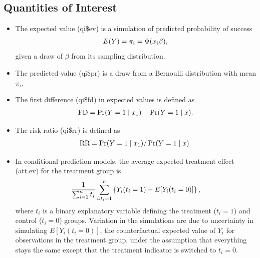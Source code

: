 \documentclass[letterpaper,10pt,english]{sphinxmanual}
\begin{document}
\subsection{Quantities of Interest}
\label{vignette:id49}\begin{itemize}
\item {} 
The expected value (qi\$ev) is a simulation of predicted probability
of success
\begin{gather}
\begin{split}E(Y) = \pi_i = \Phi(x_i
  \beta),\end{split}\notag
\end{gather}
given a draw of \(\beta\) from its sampling distribution.

\item {} 
The predicted value (qi\$pr) is a draw from a Bernoulli distribution
with mean \(\pi_i\).

\item {} 
The first difference (qi\$fd) in expected values is defined as
\begin{gather}
\begin{split}\textrm{FD} = \Pr(Y = 1 \mid x_1) - \Pr(Y = 1 \mid x).\end{split}\notag
\end{gather}
\item {} 
The risk ratio (qi\$rr) is defined as
\begin{gather}
\begin{split}\textrm{RR} = \Pr(Y = 1 \mid x_1) / \Pr(Y = 1 \mid x).\end{split}\notag
\end{gather}
\item {} 
In conditional prediction models, the average expected treatment
effect (att.ev) for the treatment group is
\begin{gather}
\begin{split}\frac{1}{\sum_{i=1}^n t_i}\sum_{i:t_i=1}^n \left\{ Y_i(t_i=1) -
      E[Y_i(t_i=0)] \right\},\end{split}\notag
\end{gather}
where \(t_i\) is a binary explanatory variable defining the
treatment (\(t_i=1\)) and control (\(t_i=0\)) groups.
Variation in the simulations are due to uncertainty in simulating
\(E[Y_i(t_i=0)]\), the counterfactual expected value of
\(Y_i\) for observations in the treatment group, under the
assumption that everything stays the same except that the treatment
indicator is switched to \(t_i=0\).


\end{itemize}
\end{document}
